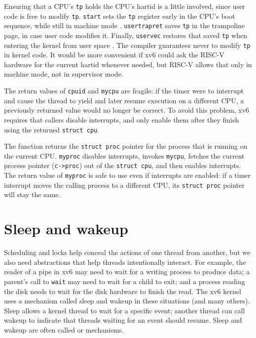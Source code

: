 Ensuring that a CPU's \lstinline{tp} holds the CPU's
hartid is a little involved, since user code is free
to modify \lstinline{tp}. \lstinline{start} sets the \lstinline{tp}
register early in the CPU's boot sequence, while still in machine mode
.
\lstinline{usertrapret} saves \lstinline{tp} in the trampoline
page, in case user code modifies it.
Finally, \lstinline{uservec} restores that saved \lstinline{tp}
when entering the kernel from user space
.
The compiler guarantees never to modify \lstinline{tp}
in kernel code.
It would be more convenient if xv6 could ask the RISC-V
hardware for the current hartid whenever needed,
but RISC-V allows that only in
machine mode, not in supervisor mode.

The return values of
\lstinline{cpuid}
and
\lstinline{mycpu}
are fragile: if the timer were to interrupt and cause
the thread to yield and later resume execution on a different CPU,
a previously returned value would no longer be correct.
To avoid this problem, xv6 requires that callers 
disable interrupts, and only enable
them after they finish using the returned
\lstinline{struct cpu}.

The function
returns the
\lstinline{struct proc}
pointer
for the process that is running on the current CPU.
\lstinline{myproc}
disables interrupts, invokes
\lstinline{mycpu},
fetches the current process pointer
(\lstinline{c->proc})
out of the
\lstinline{struct cpu},
and then enables interrupts.
The return value of
\lstinline{myproc}
is safe to use even if interrupts are enabled:
if a timer interrupt moves the calling process to a
different CPU, its
\lstinline{struct proc}
pointer will stay the same.
\section{Sleep and wakeup}
\label{sec:sleep}

Scheduling and locks help conceal the actions of one thread
from another,
but we also need abstractions that help
threads intentionally interact.
For example, the reader of a pipe in xv6 may need to wait
for a writing process to produce data;
a parent's call to \lstinline{wait} may need to
wait for a child to exit; and
a process reading the disk needs to wait
for the disk hardware to finish the read.
The xv6 kernel uses a mechanism called sleep and wakeup
in these situations (and many others).
Sleep allows a kernel thread to
wait for a specific event; another thread can call wakeup 
to indicate that threads waiting for an event should resume.
Sleep and wakeup are often called 
or 
mechanisms.

